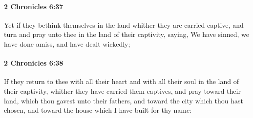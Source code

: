 		\paragraph{2 Chronicles 6:37} %
			\label{2CHRONICLES-6-37}

			Yet if they bethink themselves in the land whither they are carried captive, and turn and pray unto thee in the land of their captivity, saying, We have sinned, we have done amiss, and have dealt wickedly;


		\paragraph{2 Chronicles 6:38} %
			\label{2CHRONICLES-6-38}

			If they return to thee with all their heart and with all their soul in the land of their captivity, whither they have carried them captives, and pray toward their land, which thou gavest unto their fathers, and toward the city which thou hast chosen, and toward the house which I have built for thy name:

